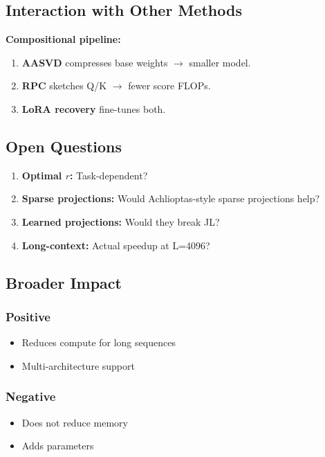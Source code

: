 \subsection{Interaction with Other Methods}

\textbf{Compositional pipeline:}

\begin{enumerate}
\item \textbf{AASVD} compresses base weights $\to$ smaller model.
\item \textbf{RPC} sketches Q/K $\to$ fewer score FLOPs.
\item \textbf{LoRA recovery} fine-tunes both.

\end{enumerate}
\subsection{Open Questions}

\begin{enumerate}
\item \textbf{Optimal $r$:} Task-dependent?
\item \textbf{Sparse projections:} Would Achlioptas-style sparse projections help?
\item \textbf{Learned projections:} Would they break JL?
\item \textbf{Long-context:} Actual speedup at L=4096?

\end{enumerate}
\subsection{Broader Impact}

\subsubsection{Positive}
\begin{itemize}
\item Reduces compute for long sequences
\item Multi-architecture support

\end{itemize}
\subsubsection{Negative}
\begin{itemize}
\item Does not reduce memory
\item Adds parameters

\end{itemize}
